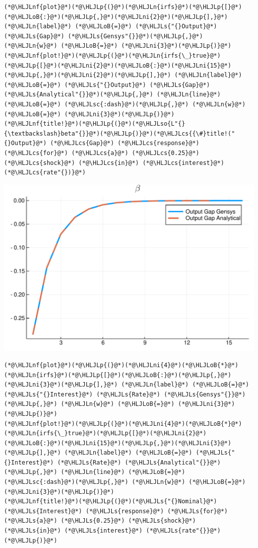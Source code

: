 \documentclass[12pt,a4paper]{article}
\newcommand{\HLJLn}[1]{#1}
\newcommand{\HLJLnf}[1]{\textcolor[RGB]{66,102,213}{#1}}
\newcommand{\HLJLs}[1]{\textcolor[RGB]{201,61,57}{#1}}
\newcommand{\HLJLsc}[1]{\textcolor[RGB]{201,61,57}{#1}}
\newcommand{\HLJLso}[1]{\textcolor[RGB]{201,61,57}{#1}}
\newcommand{\HLJLni}[1]{\textcolor[RGB]{59,151,46}{#1}}
\newcommand{\HLJLoB}[1]{\textcolor[RGB]{102,102,102}{\textbf{#1}}}
\newcommand{\HLJLp}[1]{#1}
\newcommand{\HLJLcs}[1]{\textcolor[RGB]{153,153,119}{\textit{#1}}}
\begin{document}
\begin{lstlisting}
(*@\HLJLnf{plot}@*)(*@\HLJLp{(}@*)(*@\HLJLn{irfs}@*)(*@\HLJLp{[}@*)(*@\HLJLoB{:}@*)(*@\HLJLp{,}@*)(*@\HLJLni{2}@*)(*@\HLJLp{],}@*) (*@\HLJLn{label}@*) (*@\HLJLoB{=}@*) (*@\HLJLs{"{}Output}@*) (*@\HLJLs{Gap}@*) (*@\HLJLs{Gensys"{}}@*)(*@\HLJLp{,}@*) (*@\HLJLn{w}@*) (*@\HLJLoB{=}@*) (*@\HLJLni{3}@*)(*@\HLJLp{)}@*)
(*@\HLJLnf{plot!}@*)(*@\HLJLp{(}@*)(*@\HLJLn{irfs{\_}true}@*)(*@\HLJLp{[}@*)(*@\HLJLni{2}@*)(*@\HLJLoB{:}@*)(*@\HLJLni{15}@*)(*@\HLJLp{,}@*)(*@\HLJLni{2}@*)(*@\HLJLp{],}@*) (*@\HLJLn{label}@*) (*@\HLJLoB{=}@*) (*@\HLJLs{"{}Output}@*) (*@\HLJLs{Gap}@*) (*@\HLJLs{Analytical"{}}@*)(*@\HLJLp{,}@*) (*@\HLJLn{line}@*) (*@\HLJLoB{=}@*) (*@\HLJLsc{:dash}@*)(*@\HLJLp{,}@*) (*@\HLJLn{w}@*) (*@\HLJLoB{=}@*) (*@\HLJLni{3}@*)(*@\HLJLp{)}@*)
(*@\HLJLnf{title!}@*)(*@\HLJLp{(}@*)(*@\HLJLso{L"{}{\textbackslash}beta"{}}@*)(*@\HLJLp{)}@*)(*@\HLJLcs{{\#}title!("{}Output}@*) (*@\HLJLcs{Gap}@*) (*@\HLJLcs{response}@*) (*@\HLJLcs{for}@*) (*@\HLJLcs{a}@*) (*@\HLJLcs{0.25}@*) (*@\HLJLcs{shock}@*) (*@\HLJLcs{in}@*) (*@\HLJLcs{interest}@*) (*@\HLJLcs{rate"{})}@*)
\end{lstlisting}

\includegraphics[width=\linewidth]{figures/gensys_12_1.pdf}

\begin{lstlisting}
(*@\HLJLnf{plot}@*)(*@\HLJLp{(}@*)(*@\HLJLni{4}@*)(*@\HLJLoB{*}@*)(*@\HLJLn{irfs}@*)(*@\HLJLp{[}@*)(*@\HLJLoB{:}@*)(*@\HLJLp{,}@*)(*@\HLJLni{3}@*)(*@\HLJLp{],}@*) (*@\HLJLn{label}@*) (*@\HLJLoB{=}@*) (*@\HLJLs{"{}Interest}@*) (*@\HLJLs{Rate}@*) (*@\HLJLs{Gensys"{}}@*)(*@\HLJLp{,}@*) (*@\HLJLn{w}@*) (*@\HLJLoB{=}@*) (*@\HLJLni{3}@*)(*@\HLJLp{)}@*)
(*@\HLJLnf{plot!}@*)(*@\HLJLp{(}@*)(*@\HLJLni{4}@*)(*@\HLJLoB{*}@*)(*@\HLJLn{irfs{\_}true}@*)(*@\HLJLp{[}@*)(*@\HLJLni{2}@*)(*@\HLJLoB{:}@*)(*@\HLJLni{15}@*)(*@\HLJLp{,}@*)(*@\HLJLni{3}@*)(*@\HLJLp{],}@*) (*@\HLJLn{label}@*) (*@\HLJLoB{=}@*) (*@\HLJLs{"{}Interest}@*) (*@\HLJLs{Rate}@*) (*@\HLJLs{Analytical"{}}@*)(*@\HLJLp{,}@*) (*@\HLJLn{line}@*) (*@\HLJLoB{=}@*) (*@\HLJLsc{:dash}@*)(*@\HLJLp{,}@*) (*@\HLJLn{w}@*) (*@\HLJLoB{=}@*) (*@\HLJLni{3}@*)(*@\HLJLp{)}@*)
(*@\HLJLnf{title!}@*)(*@\HLJLp{(}@*)(*@\HLJLs{"{}Nominal}@*) (*@\HLJLs{Interest}@*) (*@\HLJLs{response}@*) (*@\HLJLs{for}@*) (*@\HLJLs{a}@*) (*@\HLJLs{0.25}@*) (*@\HLJLs{shock}@*) (*@\HLJLs{in}@*) (*@\HLJLs{interest}@*) (*@\HLJLs{rate"{}}@*)(*@\HLJLp{)}@*)
\end{lstlisting}
\end{document}
